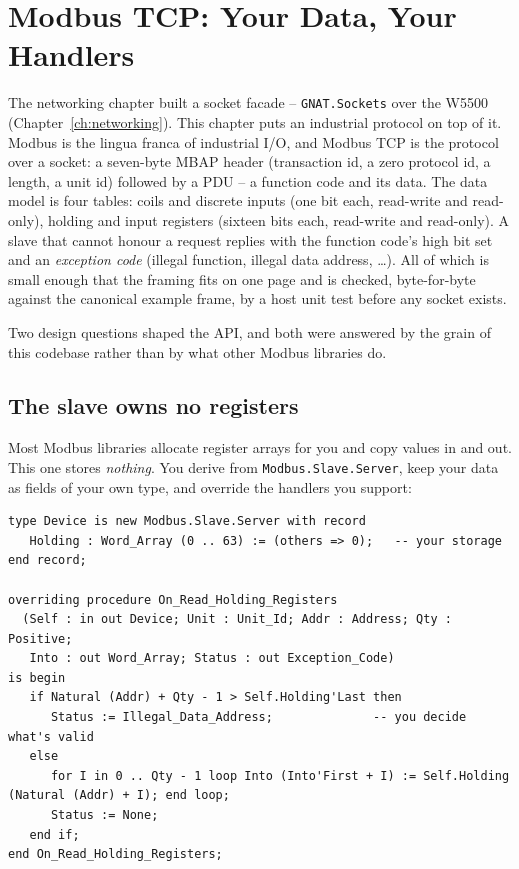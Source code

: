 \chapter{Modbus TCP: Your Data, Your Handlers}
\label{ch:modbus}

The networking chapter built a socket facade -- \texttt{GNAT.Sockets} over the
W5500 (Chapter~\ref{ch:networking}). This chapter puts an industrial protocol on
top of it. Modbus is the lingua franca of industrial I/O,
and Modbus TCP is the protocol over a socket: a seven-byte MBAP header (transaction id, a zero protocol id, a
length, a unit id) followed by a PDU -- a function code and its data. The data
model is four tables: coils and discrete inputs (one bit each, read-write and
read-only), holding and input registers (sixteen bits each, read-write and
read-only). A slave that cannot honour a request replies with the function code's
high bit set and an \emph{exception code} (illegal function, illegal data
address, \ldots). All of which is small enough that the framing fits on one page
and is checked, byte-for-byte against the canonical example frame, by a host unit
test before any socket exists.

Two design questions shaped the API, and both were answered by the grain of this
codebase rather than by what other Modbus libraries do.

\section{The slave owns no registers}

Most Modbus libraries allocate register arrays for you and copy values in and out.
This one stores \emph{nothing}. You derive from \texttt{Modbus.Slave.Server}, keep
your data as fields of your own type, and override the handlers you support:

\begin{lstlisting}
type Device is new Modbus.Slave.Server with record
   Holding : Word_Array (0 .. 63) := (others => 0);   -- your storage
end record;

overriding procedure On_Read_Holding_Registers
  (Self : in out Device; Unit : Unit_Id; Addr : Address; Qty : Positive;
   Into : out Word_Array; Status : out Exception_Code)
is begin
   if Natural (Addr) + Qty - 1 > Self.Holding'Last then
      Status := Illegal_Data_Address;              -- you decide what's valid
   else
      for I in 0 .. Qty - 1 loop Into (Into'First + I) := Self.Holding (Natural (Addr) + I); end loop;
      Status := None;
   end if;
end On_Read_Holding_Registers;
\end{lstlisting}

